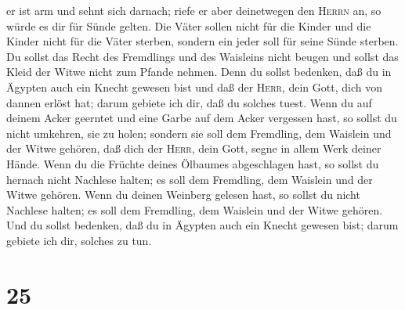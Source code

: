 er ist arm und sehnt sich darnach; riefe er aber deinetwegen den
\textsc{Herrn} an, so würde es dir für Sünde gelten.  Die
Väter sollen nicht für die Kinder und die Kinder nicht für die Väter
sterben, sondern ein jeder soll für seine Sünde sterben. 
Du sollst das Recht des Fremdlings und des Waisleins nicht beugen und
sollst das Kleid der Witwe nicht zum Pfande nehmen.  Denn
du sollst bedenken, daß du in Ägypten auch ein Knecht gewesen bist und
daß der \textsc{Herr}, dein Gott, dich von dannen erlöst hat; darum
gebiete ich dir, daß du solches tuest.  Wenn du auf
deinem Acker geerntet und eine Garbe auf dem Acker vergessen hast, so
sollst du nicht umkehren, sie zu holen; sondern sie soll dem Fremdling,
dem Waislein und der Witwe gehören, daß dich der \textsc{Herr}, dein
Gott, segne in allem Werk deiner Hände.  Wenn du die
Früchte deines Ölbaumes abgeschlagen hast, so sollst du hernach nicht
Nachlese halten; es soll dem Fremdling, dem Waislein und der Witwe
gehören.  Wenn du deinen Weinberg gelesen hast, so sollst
du nicht Nachlese halten; es soll dem Fremdling, dem Waislein und der
Witwe gehören.  Und du sollst bedenken, daß du in Ägypten
auch ein Knecht gewesen bist; darum gebiete ich dir, solches zu tun.

\hypertarget{section-24}{%
\section{25}\label{section-24}}

